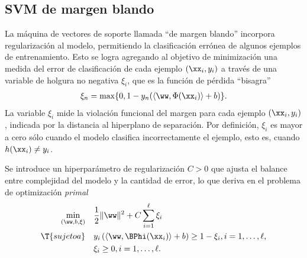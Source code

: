 %
%
\subsection{SVM de margen blando}
%
La máquina de vectores de soporte llamada ``de margen blando''
incorpora regularización al modelo, permitiendo la clasificación
errónea de algunos ejemplos de entrenamiento.
%
Esto se logra agregando al objetivo de minimización una medida del
error de clasificación de cada ejemplo $(\xx_i,y_i)$ a través de una
variable de holgura no negativa $\xi_i$, que es la función de pérdida
``bisagra''
%
\begin{align}
  \xi_n = \max\{0,1-y_n(\langle{}\ww,\Phi(\xx_i)\rangle+b)\}.
\end{align}
%
La variable $\xi_i$ mide la violación funcional del margen para cada
ejemplo $(\xx_i,y_i)$, indicada por la distancia al hiperplano de
separación.
Por definición, $\xi_i$ es mayor a cero sólo cuando el modelo
clasifica incorrectamente el ejemplo, esto es, cuando
$h(\xx_i)\neq{}y_i$.

Se introduce un hiperparámetro de regularización $C>0$ que ajusta el
balance entre complejidad del modelo y la cantidad de error, lo que deriva
en el problema de optimización \emph{primal}
%
\begin{equation}\label{svm-primal-blando}
  \begin{aligned}
    \min_{(\ww,b,\xi)} \quad & \frac{1}{2}\|\ww\|^2+C\sum_{i=1}^{\ell}\xi_i\\
    \T{sujeto a} \quad &
    y_i\left(\langle{}\ww,\BPhi(\xx_i)\rangle+b\right) \geq 1-\xi_i, i=1,\ldots,\ell, \\
    & \xi_i \geq 0, i=1,\ldots,\ell.
  \end{aligned}
\end{equation}
%


